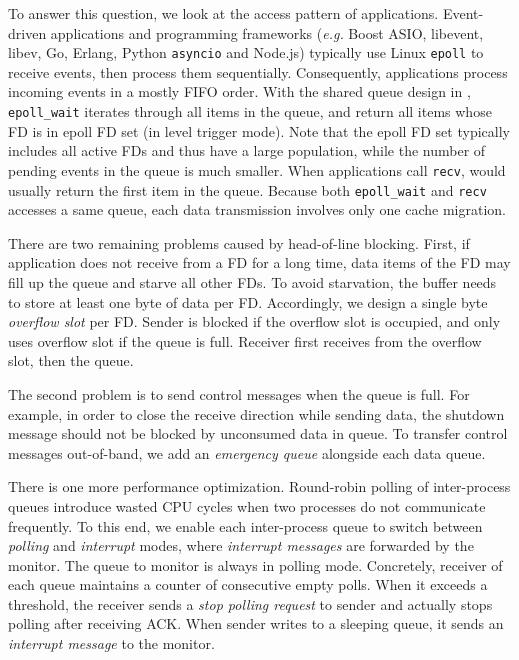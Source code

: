 To answer this question, we look at the access pattern of applications. Event-driven applications and programming frameworks (\textit{e.g.} Boost ASIO, libevent, libev, Go, Erlang, Python \texttt{asyncio} and Node.js) typically use Linux \texttt{epoll} to receive events, then process them sequentially.
Consequently, applications process incoming events in a mostly FIFO order. With the shared queue design in \libipc{}, \texttt{epoll\_wait} iterates through all items in the queue, and return all items whose FD is in epoll FD set (in level trigger mode). Note that the epoll FD set typically includes all active FDs and thus have a large population, while the number of pending events in the queue is much smaller. When applications call \texttt{recv}, \libipc{} would usually return the first item in the queue. Because both \texttt{epoll\_wait} and \texttt{recv} accesses a same queue, each data transmission involves only one cache migration.

There are two remaining problems caused by head-of-line blocking. First, if application does not receive from a FD for a long time, data items of the FD may fill up the queue and starve all other FDs. To avoid starvation, the buffer needs to store at least one byte of data per FD. Accordingly, we design a single byte \textit{overflow slot} per FD. Sender is blocked if the overflow slot is occupied, and only uses overflow slot if the queue is full. Receiver first receives from the overflow slot, then the queue.

The second problem is to send control messages when the queue is full. For example, in order to close the receive direction while sending data, the shutdown message should not be blocked by unconsumed data in queue. To transfer control messages out-of-band, we add an \textit{emergency queue} alongside each data queue.

There is one more performance optimization. Round-robin polling of inter-process queues introduce wasted CPU cycles when two processes do not communicate frequently. To this end, we enable each inter-process queue to switch between \textit{polling} and \textit{interrupt} modes, where \textit{interrupt messages} are forwarded by the monitor. The queue to monitor is always in polling mode. Concretely, receiver of each queue maintains a counter of consecutive empty polls. When it exceeds a threshold, the receiver sends a \textit{stop polling request} to sender and actually stops polling after receiving ACK. When sender writes to a sleeping queue, it sends an \textit{interrupt message} to the monitor.

